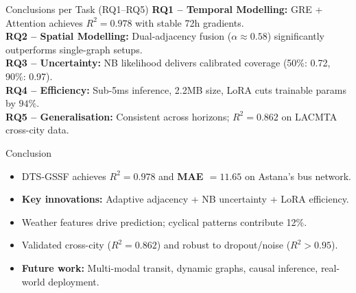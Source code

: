 \documentclass[aspectratio=169, 11pt]{beamer}
\begin{document}
\begin{frame}{Conclusions per Task (RQ1--RQ5)}
  \small
  \textbf{RQ1 -- Temporal Modelling:} GRE + Attention achieves $R^{2}=0.978$ with stable 72h gradients.\\
  \textbf{RQ2 -- Spatial Modelling:} Dual-adjacency fusion ($\alpha \approx 0.58$) significantly outperforms single-graph setups.\\
  \textbf{RQ3 -- Uncertainty:} NB likelihood delivers calibrated coverage (50\%: 0.72, 90\%: 0.97).\\
  \textbf{RQ4 -- Efficiency:} Sub-5ms inference, 2.2MB size, LoRA cuts trainable params by $94\%$.\\
  \textbf{RQ5 -- Generalisation:} Consistent across horizons; $R^{2}=0.862$ on LACMTA cross-city data.
\end{frame}

\begin{frame}{Conclusion}
  \begin{itemize}
    \item DTS-GSSF achieves \textbf{$R^{2} = 0.978$} and \textbf{MAE $= 11.65$} on Astana's bus network.
    \item \textbf{Key innovations:} Adaptive adjacency + NB uncertainty + LoRA efficiency.
    \item Weather features drive prediction; cyclical patterns contribute 12\%.
    \item Validated cross-city ($R^{2}=0.862$) and robust to dropout/noise ($R^{2}>0.95$).
    \item \textbf{Future work:} Multi-modal transit, dynamic graphs, causal inference, real-world deployment.
  \end{itemize}
\end{frame}
\end{document}
